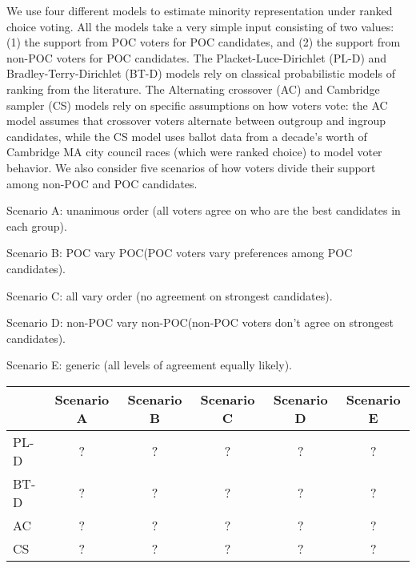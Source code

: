 \documentclass{report}
\newcommand{\POC}{POC\xspace} %
\begin{document}
We use four different models to estimate minority representation under ranked choice voting. All the models take a very simple input consisting of two values: (1) the support from \POC voters for \POC candidates, and (2) the support from non-\POC voters for \POC candidates. The Placket-Luce-Dirichlet (PL-D) and Bradley-Terry-Dirichlet (BT-D) models rely on classical probabilistic models of ranking from the literature. The Alternating crossover (AC) and Cambridge sampler (CS) models rely on specific assumptions on how voters vote: the AC model assumes that crossover voters alternate between outgroup and ingroup candidates, while the CS model uses ballot data from a decade's worth of Cambridge MA city council races (which were ranked choice) to model voter behavior. We also consider five scenarios of how voters divide their support among non-\POC and \POC candidates.

Scenario A: unanimous order (all voters agree on who are the best candidates in each group).

Scenario B: \POC vary \POC (POC voters vary preferences among \POC candidates).

Scenario C: all vary order (no agreement on strongest candidates).

Scenario D: non-\POC vary non-\POC (non-\POC voters don’t agree on strongest candidates).

Scenario E: generic (all levels of agreement equally likely).

\begin{table}[ht]
\centering
\begin{tabular}{ |l||c|c|c|c|c| }
\hline
 & Scenario A & Scenario B & Scenario C & Scenario D & Scenario E \\
 \hline
\hline
PL-D  & ? & ? & ? & ? & ? \\
\hline
BT-D  & ? & ? & ? & ? & ?  \\
\hline
AC & ? & ? & ? & ? & ? \\
\hline
CS & ? & ? & ? & ? & ? \\
\hline
\end{tabular}
\end{table}
\end{document}
